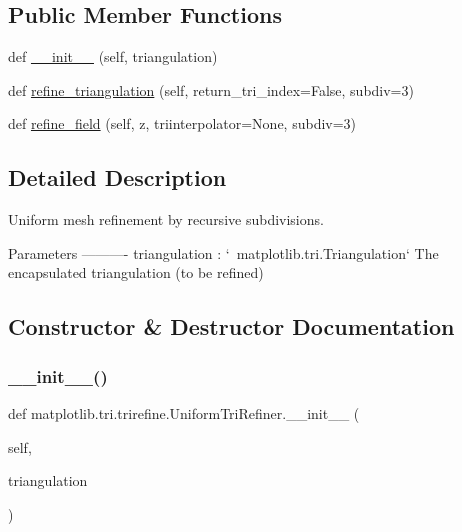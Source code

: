 \subsection*{Public Member Functions}
\begin{DoxyCompactItemize}
\item 
def \hyperlink{classmatplotlib_1_1tri_1_1trirefine_1_1UniformTriRefiner_a30ff5e2c0cb0daef69eb86f919bfba82}{\+\_\+\+\_\+init\+\_\+\+\_\+} (self, triangulation)
\item 
def \hyperlink{classmatplotlib_1_1tri_1_1trirefine_1_1UniformTriRefiner_afae7d843d5e02cefdc3f35bee6ef090e}{refine\+\_\+triangulation} (self, return\+\_\+tri\+\_\+index=False, subdiv=3)
\item 
def \hyperlink{classmatplotlib_1_1tri_1_1trirefine_1_1UniformTriRefiner_a6c9a6d3f49d0d5cec563208e19a5de08}{refine\+\_\+field} (self, z, triinterpolator=None, subdiv=3)
\end{DoxyCompactItemize}


\subsection{Detailed Description}
\begin{DoxyVerb}Uniform mesh refinement by recursive subdivisions.

Parameters
----------
triangulation : `~matplotlib.tri.Triangulation`
    The encapsulated triangulation (to be refined)
\end{DoxyVerb}
 

\subsection{Constructor \& Destructor Documentation}
\mbox{\label{classmatplotlib_1_1tri_1_1trirefine_1_1UniformTriRefiner_a30ff5e2c0cb0daef69eb86f919bfba82}} 
\subsubsection{\texorpdfstring{\+\_\+\+\_\+init\+\_\+\+\_\+()}{\_\_init\_\_()}}
{\footnotesize\ttfamily def matplotlib.\+tri.\+trirefine.\+Uniform\+Tri\+Refiner.\+\_\+\+\_\+init\+\_\+\+\_\+ (\begin{DoxyParamCaption}\item[{}]{self,  }\item[{}]{triangulation }\end{DoxyParamCaption})}



